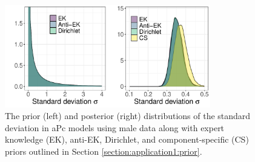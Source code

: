
\begin{figure}[h!]
    \centering
    \includegraphics[width=0.8\textwidth]{Figures/compare_plots_s0_m.pdf}
    \caption{The prior (left) and posterior (right) distributions of the standard deviation in aPc models using male data along with expert knowledge (EK), anti-EK, Dirichlet, and component-specific (CS) priors outlined in Section \ref{section:application1:prior}. }
    \label{figure:Application1:s0_m}
\end{figure}

